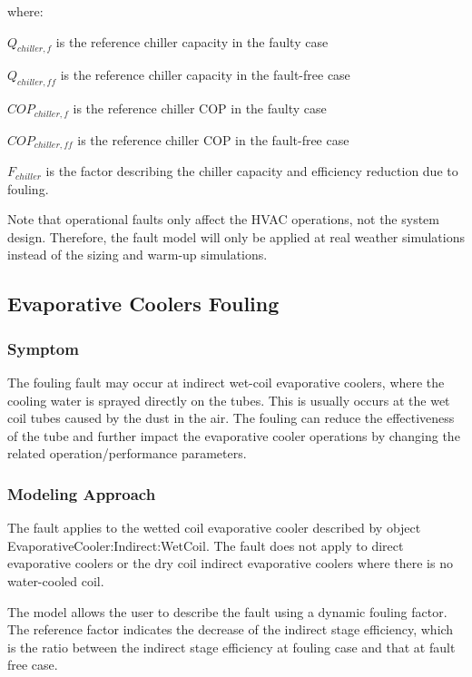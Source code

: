 where:

\(Q_{chiller,f}\) is the reference chiller capacity in the faulty case

\(Q_{chiller,ff}\) is the reference chiller capacity in the fault-free case

\(COP_{chiller,f}\) is the reference chiller COP in the faulty case

\(COP_{chiller,ff}\) is the reference chiller COP in the fault-free case

\(F_{chiller}\) is the factor describing the chiller capacity and efficiency reduction due to fouling.

Note that operational faults only affect the HVAC operations, not the system design. Therefore, the fault model will only be applied at real weather simulations instead of the sizing and warm-up simulations.


\subsection{Evaporative Coolers Fouling}\label{evaporative-cooler-fouling}

\subsubsection{Symptom}

The fouling fault may occur at indirect wet-coil evaporative coolers, where the cooling water is sprayed directly on the tubes. This is usually occurs at the wet coil tubes caused by the dust in the air. The fouling can reduce the effectiveness of the tube and further impact the evaporative cooler operations by changing the related operation/performance parameters.

\subsubsection{Modeling Approach}

The fault applies to the wetted coil evaporative cooler described by object EvaporativeCooler:Indirect:WetCoil. The fault does not apply to direct evaporative coolers or the dry coil indirect evaporative coolers where there is no water-cooled coil.

The model allows the user to describe the fault using a dynamic fouling factor. The reference factor indicates the decrease of the indirect stage efficiency, which is the ratio between the indirect stage efficiency at fouling case and that at fault free case.

